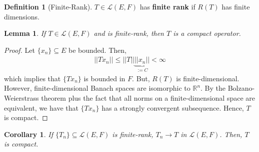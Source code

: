 \documentclass[psamsfonts]{amsart}
\newtheorem{cor}[thm]{Corollary}
\newtheorem{lem}[thm]{Lemma}
\theoremstyle{definition}
\newtheorem{defn}[thm]{Definition}
\theoremstyle{remark}
\newcommand{\R}[0]{\mathbb{R}}
\numberwithin{equation}{section}
\begin{document}
\begin{defn}[Finite-Rank]
	\( T \in \mathcal{L}(E,F) \) has \textbf{finite rank} if \(R(T) \) has finite dimensions. 
\end{defn}

\begin{lem}
	If \( T \in \mathcal{L}(E,F) \) and is finite-rank, then \( T \) is a compact operator.
\end{lem}

\begin{proof}
	Let \( \{ x_n \} \subseteq E \) be bounded. Then, 
	\begin{align*}
		|| Tx_n || \leq ||T || \underbrace{||x_n||}_{:=C} < \infty 
	\end{align*}
	which implies that \( \{ Tx_n \} \) is bounded in \( F \). But, \( R(T) \) is finite-dimensional. However, finite-dimensional Banach spaces are isomorphic to \( \R^n \). By the Bolzano-Weierstrass theorem plus the fact that all norms on a finite-dimensional space are equivalent, we have that \( \{ T x_n \} \) has a strongly convergent subsequence. Hence, \( T \) is compact. 
\end{proof}

\begin{cor}
	If \( \{ T_n \} \subseteq \mathcal{L}(E,F) \) is finite-rank, \( T_n \rightarrow T \) in \( \mathcal{L}(E, F) \). Then, \( T \) is compact.	
\end{cor}
\end{document}
